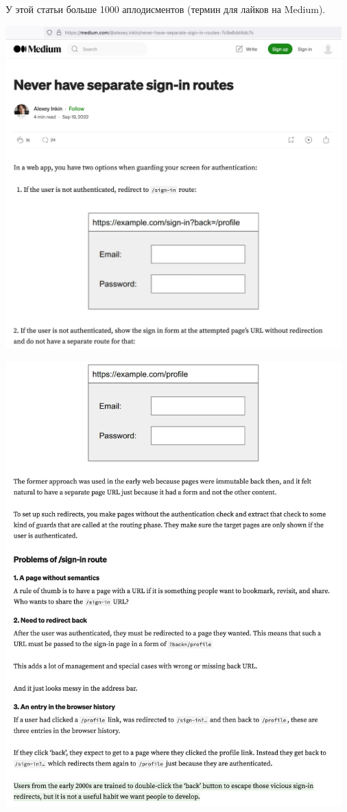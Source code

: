 
У этой статьи больше 1000 аплодисментов (термин для лайков на Medium).

\begin{center}
    \includegraphics[width=35em]{sign-in-routes-p1}
\end{center}
\WillContinue
\pagebreak

\Continuing
\begin{center}
    \includegraphics[width=35em]{sign-in-routes-p2}
\end{center}
\WillContinue
\pagebreak

